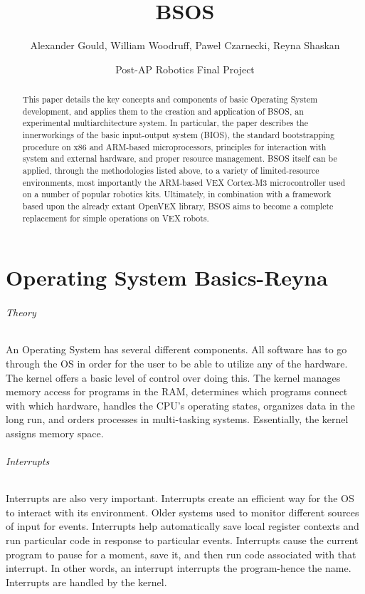 \documentclass[english]{paper}
\begin{document}
\title{BSOS}

\author{Alexander Gould, William Woodruff, Pawe\l{} Czarnecki, Reyna Shaskan}

\date{Post-AP Robotics Final Project}
\maketitle
\begin{abstract}
This paper details the key concepts and components of basic Operating System development, and applies them to the creation and application of BSOS, an experimental multiarchitecture system. In particular, the paper describes the innerworkings of the basic input-output system (BIOS), the standard bootstrapping procedure on x86 and ARM-based microprocessors, principles for interaction with system and external hardware, and proper resource management. BSOS itself can be applied, through the methodologies listed above, to a variety of limited-resource environments, most importantly the ARM-based VEX Cortex-M3 microcontroller used on a number of popular robotics kits. Ultimately, in combination with a framework based upon the already extant OpenVEX library, BSOS aims to become a complete replacement for simple operations on VEX robots.
\end{abstract}

\part{Operating System Basics-Reyna}
\paragraph{Theory}
An Operating System has several different components. All software has to go through the OS in order for the user to be able to utilize any of the hardware. The kernel offers a basic level of control over doing this. The kernel manages memory access for programs in the RAM, determines which programs connect with which hardware, handles the CPU's operating states, organizes data in the long run, and orders processes in multi-tasking systems. Essentially, the kernel assigns memory space.

\paragraph{Interrupts}
Interrupts are also very important. Interrupts create an efficient way for the OS to interact with its environment. Older systems used to monitor different sources of input for events. Interrupts help automatically save local register contexts and run particular code in response to particular events. Interrupts cause the current program to pause for a moment, save it, and then run code associated with that interrupt. In other words, an interrupt interrupts the program-hence the name. Interrupts are handled by the kernel.
\end{document}
